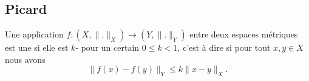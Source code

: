 \subsection{Picard}

\begin{definition}      \label{DEFooRSLCooAsWisu}
    Une application \( f\colon (X,\| . \|_X)\to (Y,\| . \|_Y)\) entre deux espaces métriques est une  si elle est \( k\)- pour un certain \( 0\leq k<1\), c'est à dire si pour tout \( x,y\in X\) nous avons
    \begin{equation}
        \| f(x)-f(y) \|_Y\leq k\| x-y \|_{X}.
    \end{equation}
\end{definition}

